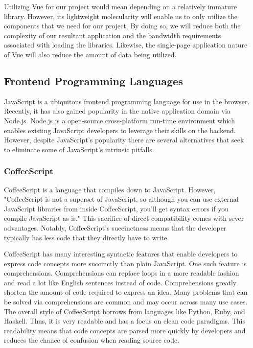 \documentclass[12pt]{report}
\begin{document}
Utilizing Vue for our project would mean depending on a relatively immature library. However, its lightweight molecularity will enable us to only utilize the components that we need for our project. By doing so, we will reduce both the complexity of our resultant application and the bandwidth requirements associated with loading the libraries. Likewise, the single-page application nature of Vue will also reduce the amount of data being utilized.

\subsection*{Frontend Programming Languages}

JavaScript is a ubiquitous frontend programming language for use in the browser. Recently, it has also gained popularity in the native application domain via Node.js. Node.js is a open-source cross-platform run-time environment which enables existing JavaScript developers to leverage their skills on the backend. However, despite JavaScript's popularity there are several alternatives that seek to eliminate some of JavaScript's intrinsic pitfalls.

\subsubsection*{CoffeeScript}

CoffeeScript is a language that compiles down to JavaScript.\cite{coffeescriptlittlebook} However, "CoffeeScript is not a superset of JavaScript, so although you can use external JavaScript libraries from inside CoffeeScript, you'll get syntax errors if you compile JavaScript as is."\cite{coffeescriptlittlebook} This sacrifice of direct compatibility comes with sever advantages. Notably, CoffeeScript's succinctness means that the developer typically has less code that they directly have to write.

CoffeeScript has many interesting syntactic features that enable developers to express code concepts more succinctly than plain JavaScript. One such feature is comprehensions.\cite{coffeescriptguide} Comprehensions can replace loops in a more readable fashion and read a lot like English sentences instead of code. Comprehensions greatly shorten the amount of code required to express an idea. Many problems that can be solved via comprehensions are common and may occur across many use cases. The overall style of CoffeeScript borrows from languages like Python, Ruby, and Haskell. Thus, it is very readable and has a focus on clean code paradigms. This readability means that code concepts are parsed more quickly by developers and reduces the chance of confusion when reading source code.
\end{document}

